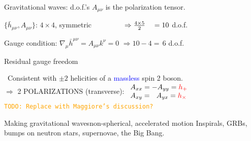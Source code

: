 \documentclass[xcolor=dvipsnames,handout,t]{beamer}
\newcommand{\todo}[1]{\textcolor{orange}{\texttt{TODO: #1}}}
\newcommand{\red}[1]{\textcolor{red}{#1}}
\newcommand{\bl}[1]{\textcolor{blue}{#1}}
\newcommand{\f}{\frac}
\begin{document}
\begin{frame}{Gravitational waves: d.o.f.'s}
$A_{\mu\nu} $ is the polarization tensor.
\begin{itemize}
{\item $\{ \bar{h}_{\mu\nu}, A_{\mu\nu} \}$: $4\times4$, symmetric {$\hspace{1.5cm}\Rightarrow \f{4\times 5}{2}\ \ \ = 10$ d.o.f.}}
 {\item Gauge condition: $\nabla_\mu \bar{h}^{\mu\nu} =  A_{\mu\nu} k^\nu= 0${ $\Rightarrow10-4 = \,6$ d.o.f.}}
 {\item Residual gauge freedom }
\end{itemize}
{\quad \ Consistent with $\pm 2$ helicities of a \bl{massless} spin 2 boson.\\}
{$\Rightarrow$ \alert{2} POLARIZATIONS (\alert{transverse}): {$\begin{array}{l}A_{xx}=-A_{yy} = \red{h_+}  \\ A_{xy}=\ \ A_{yx} = \red{h_\times}  \\ \end{array}$}}
\\
\todo{Replace with Maggiore's discussion?}
{\begin{center}  \hspace{1cm} \end{center}}
\end{frame}

\begin{frame}{Making gravitational waves}{non-spherical, accelerated motion}
 \alert{Inspirals}, GRBs, bumps on neutron stars, supernovae, the Big Bang. \\%
 \uncover<3->{\begin{center} $ \boxed{\dot{E}=L_\text{GW} = \f{G}{c^5} \langle (\partial_t^3 \bar{Q}_{ij})^2 \rangle}$\\\vspace{2mm}}
 
\end{frame}
\end{document}
